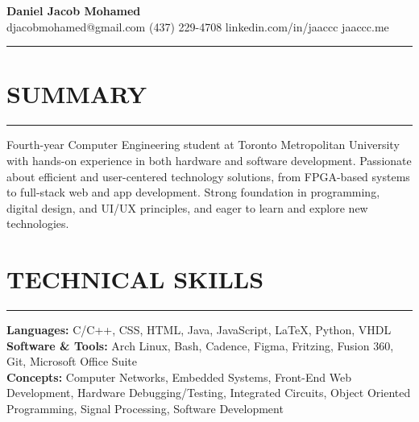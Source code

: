 \documentclass[12pt, letterpaper]{article}
\begin{document}
	\begin{center}
		{\huge\textbf{Daniel Jacob Mohamed}}\\
		djacobmohamed@gmail.com \textbullet\space (437) 229-4708 \textbullet\space linkedin.com/in/jaaccc \textbullet\space jaaccc.me
		\noindent\rule{\textwidth}{1pt}
	\end{center}
	
	\section*{SUMMARY}
		\noindent\rule{\textwidth}{0.5pt}
		Fourth-year Computer Engineering student at Toronto Metropolitan University with hands-on experience in both hardware and software development. Passionate about efficient and user-centered technology solutions, from FPGA-based systems to full-stack web and app development. Strong foundation in programming, digital design, and UI/UX principles, and eager to learn and explore new technologies.
	
	\section*{TECHNICAL SKILLS}
		\noindent\rule{\textwidth}{0.5pt}
		\textbf{Languages:} C/C++, CSS, HTML, Java, JavaScript, LaTeX, Python, VHDL\\
		\textbf{Software \& Tools:} Arch Linux, Bash, Cadence, Figma, Fritzing, Fusion 360, Git, Microsoft Office Suite\\
		\textbf{Concepts:} Computer Networks, Embedded Systems, Front-End Web Development, Hardware Debugging/Testing, Integrated Circuits, Object Oriented Programming, Signal Processing, Software Development
		
\end{document}
